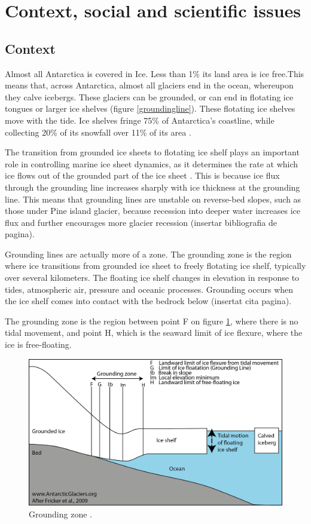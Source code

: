 \documentclass[a4paper,12pt]{article}
\begin{document}
\section{Context, social and scientific issues}
\subsection{Context}

Almost all Antarctica is covered in Ice. Less than 1\% its land area is ice free.This means that, across Antarctica, almost all glaciers end in the ocean, whereupon they calve icebergs. These glaciers can be grounded, or can end in flotating ice tongues or larger ice shelves (figure \ref{groundingline}). These flotating ice shelves move with the tide. Ice shelves fringe 75\% of Antarctica's coastline, while collecting 20\% of its snowfall over 11\% of its area \cite[]{rignot2013ice}.

The transition from grounded ice sheets to flotating ice shelf plays an important role in controlling marine ice sheet dynamics, as it determines the rate at which ice flows out of the grounded part of the ice sheet \cite[]{schoof2007ice}. This is because ice flux through the grounding line increases sharply with ice thickness at the grounding line. This means that grounding lines are unstable on reverse-bed slopes, such as those under Pine island glacier, because recession into deeper water increases ice flux and further encourages more glacier recession (insertar bibliografia de pagina).

Grounding lines are actually more of a zone. The grounding zone is the region where ice transitions from grounded ice sheet to freely flotating ice shelf, typically over several kilometers. The floating ice shelf changes in elevation in response to tides, atmospheric air, pressure and oceanic processes. Grounding occurs when the ice shelf comes into contact with the bedrock below (insertat cita pagina).

The grounding zone is the region between point F on figure \ref{groundingzone}, where there is no tidal movement, and point H, which is the seaward limit of ice flexure, where the ice is free-floating.

\begin{figure}[!h]
	\centering
	\includegraphics[width=0.7\linewidth]{../fig/groundingzone}
	\caption{Grounding zone \cite[]{fricker2009mapping}.}
	\label{groundingzone}
\end{figure}
\end{document}
